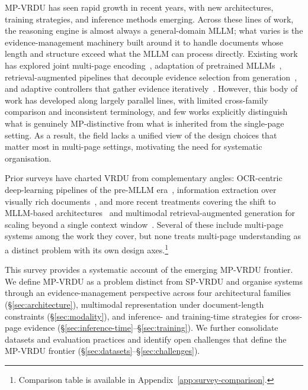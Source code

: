 \documentclass[11pt]{article}
\begin{document}
MP-VRDU has seen rapid growth in recent years, with new architectures, training strategies, and inference methods emerging. Across these lines of work, the reasoning engine is almost always a general-domain MLLM; what varies is the evidence-management machinery built around it to handle documents whose length and structure exceed what the MLLM can process directly. Existing work has explored joint multi-page encoding~\cite{tito2023hierarchical}, adaptation of pretrained MLLMs~\cite{duan2025docopilot}, retrieval-augmented pipelines that decouple evidence selection from generation~\cite{cho2024m3docrag}, and adaptive controllers that gather evidence iteratively~\cite{sun2025docagent}. However, this body of work has developed along largely parallel lines, with limited cross-family comparison and inconsistent terminology, and few works explicitly distinguish what is genuinely MP-distinctive from what is inherited from the single-page setting. As a result, the field lacks a unified view of the design choices that matter most in multi-page settings, motivating the need for systematic organisation.

Prior surveys have charted VRDU from complementary angles: OCR-centric deep-learning pipelines of the pre-MLLM era~\cite{subramani2020survey}, information extraction over visually rich documents~\cite{ding2026deep, gbada2025deep}, and more recent treatments covering the shift to MLLM-based architectures~\cite{ding2026survey} and multimodal retrieval-augmented generation for scaling beyond a single context window~\cite{gao2026scaling}. Several of these include multi-page systems among the work they cover, but none treats multi-page understanding as a distinct problem with its own design axes.\footnote{Comparison table is available in Appendix~\ref{app:survey-comparison}.}

This survey provides a systematic account of the emerging MP-VRDU frontier. We define MP-VRDU as a problem distinct from SP-VRDU and organise systems through an evidence-management perspective across four architectural families (\S\ref{sec:architecture}), multimodal representation under document-length constraints (\S\ref{sec:modality}), and inference- and training-time strategies for cross-page evidence (\S\ref{sec:inference-time}--\S\ref{sec:training}). We further consolidate datasets and evaluation practices and identify open challenges that define the MP-VRDU frontier (\S\ref{sec:datasets}--\S\ref{sec:challenges}).
\end{document}
